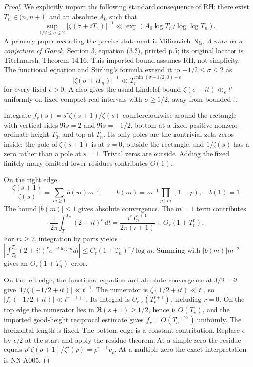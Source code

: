 \begin{proof}
We explicitly import the following standard consequence of RH: there
exist $T_n\in(n,n+1]$ and an absolute $A_0$ such that
\[
 \sup_{1/2\le\sigma\le2}|\zeta(\sigma+iT_n)|^{-1}
 \ll\exp(A_0\log T_n/\log\log T_n).
\]
A primary paper recording the precise statement is Milinovich--Ng,
\emph{A note on a conjecture of Gonek}, Section 3, equation (3.2),
printed p.5; its original locator is Titchmarsh, Theorem 14.16.
This imported bound assumes RH, not simplicity. The functional equation
and Stirling's formula extend it to $-1/2\le\sigma\le2$ as
\[
 |\zeta(\sigma+iT_n)|^{-1}
 \ll T_n^{\min(\sigma-1/2,0)+\epsilon}
\]
for every fixed $\epsilon>0$. A also gives the usual Lindelof bound
$\zeta(\sigma+it)\ll_\epsilon t^\epsilon$ uniformly on fixed compact
real intervals with $\sigma\ge1/2$, away from bounded $t$.

Integrate $f_r(s)=s^r\zeta(s+1)/\zeta(s)$ counterclockwise around
the rectangle with vertical sides $\Re s=2$ and $\Re s=-1/2$,
bottom at a fixed positive nonzero-ordinate height $T_0$, and top at
$T_n$. Its only poles are the nontrivial zeta zeros inside; the pole
of $\zeta(s+1)$ is at $s=0$, outside the rectangle, and $1/\zeta(s)$
has a zero rather than a pole at $s=1$. Trivial zeros are outside.
Adding the fixed finitely many omitted lower residues contributes $O(1)$.

On the right edge,
\[
 \frac{\zeta(s+1)}{\zeta(s)}=
 \sum_{m\ge1}b(m)m^{-s},\qquad
 b(m)=m^{-1}\prod_{p\mid m}(1-p),\quad b(1)=1.
\]
The bound $|b(m)|\le1$ gives absolute convergence. The $m=1$ term
contributes
\[
 \frac1{2\pi}\int_{T_0}^{T_n}(2+it)^r\,dt
 =\frac{i^rT_n^{r+1}}{2\pi(r+1)}+O_r(1+T_n^r).
\]
For $m\ge2$, integration by parts yields
$|\int_{T_0}^{T_n}(2+it)^re^{-it\log m}dt|
\le C_r(1+T_n)^r/\log m$.
Summing with $|b(m)|m^{-2}$ gives an $O_r(1+T_n^r)$ error.

On the left edge, the functional equation and absolute convergence at
$3/2-it$ give $|1/\zeta(-1/2+it)|\ll t^{-1}$.
The numerator is $\zeta(1/2+it)\ll t^\epsilon$, so
$|f_r(-1/2+it)|\ll t^{r-1+\epsilon}$.
Its integral is $O_{r,\epsilon}(T_n^{r+\epsilon})$, including $r=0$.
On the top edge the numerator lies in $\Re(s+1)\ge1/2$, hence is
$O(T_n^\epsilon)$, and the imported good-height reciprocal estimate
gives $f_r=O(T_n^{r+2\epsilon})$ uniformly. The horizontal length
is fixed. The bottom edge is a constant contribution. Replace
$\epsilon$ by $\epsilon/2$ at the start and apply the residue theorem.
At a simple zero the residue equals
$\rho^r\zeta(\rho+1)/\zeta'(\rho)=\rho^{r-1}v_\rho$.
At a multiple zero the exact interpretation is NN-A005.
\end{proof}

